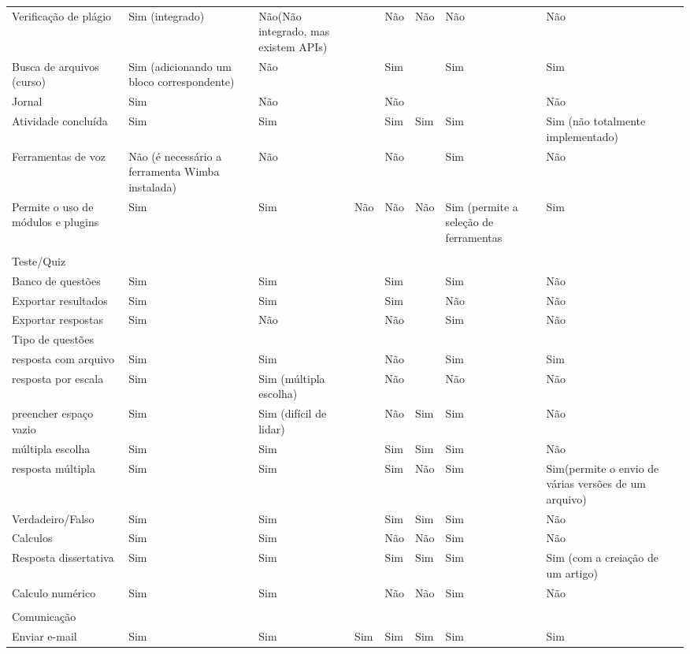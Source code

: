 \begin{table}[!htb]
\begin{tabular}{@{}lllllllll@{}}
Verificação de plágio & Sim (integrado) & Não(Não integrado, mas existem APIs) &  & Não & Não & Não & Não &  \\
Busca de arquivos (curso) & Sim (adicionando um bloco correspondente) & Não &  & Sim &  & Sim & Sim &  \\
Jornal & Sim & Não &  & Não &  &  & Não &  \\
Atividade concluída & Sim & Sim &  & Sim & Sim & Sim & Sim (não totalmente implementado) &  \\
Ferramentas de voz & Não (é necessário a ferramenta Wimba instalada) & Não &  & Não &  & Sim & Não &  \\
Permite o uso de módulos e plugins & Sim & Sim & Não & Não & Não & Sim (permite a seleção de ferramentas & Sim &  \\
 &  &  &  &  &  &  &  &  \\
Teste/Quiz &  &  &  &  &  &  &  &  \\
Banco de questões & Sim & Sim &  & Sim &  & Sim & Não &  \\
Exportar resultados & Sim & Sim &  & Sim &  & Não & Não &  \\
Exportar respostas & Sim & Não &  & Não &  & Sim & Não &  \\
Tipo de questões &  &  &  &  &  &  &  &  \\
resposta com arquivo & Sim & Sim &  & Não &  & Sim & Sim &  \\
resposta por escala & Sim & Sim (múltipla escolha) &  & Não &  & Não & Não &  \\
preencher espaço vazio & Sim & Sim (difícil de lidar) &  & Não & Sim & Sim & Não &  \\
múltipla escolha & Sim & Sim &  & Sim & Sim & Sim & Não &  \\
resposta múltipla & Sim & Sim &  & Sim & Não & Sim & Sim(permite o envio de várias versões de um arquivo) &  \\
Verdadeiro/Falso & Sim & Sim &  & Sim & Sim & Sim & Não &  \\
Calculos & Sim & Sim &  & Não & Não & Sim & Não &  \\
Resposta dissertativa & Sim & Sim &  & Sim & Sim & Sim & Sim (com a creiação de um artigo) &  \\
Calculo numérico & Sim & Sim &  & Não & Não & Sim & Não &  \\
 &  &  &  &  &  &  &  &  \\
Comunicação &  &  &  &  &  &  &  &  \\
Enviar e-mail & Sim & Sim & Sim & Sim & Sim & Sim & Sim &  \\

\end{tabular}
\end{table}
